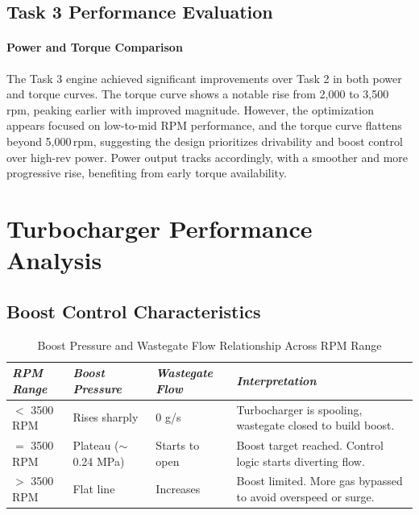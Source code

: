 \subsection{Task 3 Performance Evaluation}

\paragraph{Power and Torque Comparison}
The Task 3 engine achieved significant improvements over Task 2 in both power and torque curves. The torque curve shows a notable rise from 2,000 to 3,500\,rpm, peaking earlier with improved magnitude. However, the optimization appears focused on low-to-mid RPM performance, and the torque curve flattens beyond 5,000\,rpm, suggesting the design prioritizes drivability and boost control over high-rev power. Power output tracks accordingly, with a smoother and more progressive rise, benefiting from early torque availability.


\section{Turbocharger Performance Analysis}


\subsection{Boost Control Characteristics}

\begin{table}[H]
\centering
\caption{Boost Pressure and Wastegate Flow Relationship Across RPM Range}
\small
\begin{tabular}{@{}p{2.5cm}p{3cm}p{2.5cm}p{6cm}@{}}
\toprule
\textbf{\textit{RPM Range}} & \textbf{\textit{Boost Pressure}} & \textbf{\textit{Wastegate Flow}} & \textbf{\textit{Interpretation}} \\
\midrule
$<$ 3500 RPM & Rises sharply & 0 g/s & Turbocharger is spooling, wastegate closed to build boost. \\
\addlinespace
$=$ 3500 RPM & Plateau ($\sim$0.24 MPa) & Starts to open & Boost target reached. Control logic starts diverting flow. \\
\addlinespace
$>$ 3500 RPM & Flat line & Increases & Boost limited. More gas bypassed to avoid overspeed or surge. \\
\bottomrule
\end{tabular}
\label{tab:boost_wastegate}
\end{table}

